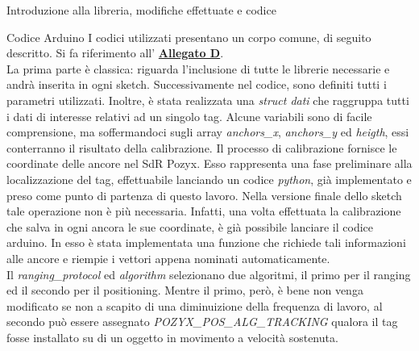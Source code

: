 \documentclass[12pt]{report}
\begin{document}
\begin{section}{Introduzione alla libreria, modifiche effettuate e codice}
\begin{subsection}{Codice Arduino}
			I codici utilizzati presentano un corpo comune, di seguito descritto. Si fa riferimento all' \hyperlink{A4}{\textbf{Allegato D}}.\\ 
			La prima parte è classica: riguarda l’inclusione di tutte le librerie necessarie e andrà inserita in ogni sketch. Successivamente nel codice, sono definiti tutti i parametri utilizzati. Inoltre, è stata realizzata una \textit{struct dati} che raggruppa tutti i dati di interesse relativi ad un singolo tag. Alcune 											variabili sono di facile comprensione, ma soffermandoci sugli array \textit{anchors\_x}, \textit{anchors\_y} ed \textit{heigth}, essi conterranno il risultato della calibrazione. Il processo di calibrazione fornisce le coordinate delle ancore nel SdR Pozyx. Esso rappresenta una fase preliminare alla localizzazione del 					tag, effettuabile lanciando un codice \textit{python}, già implementato e preso come punto di partenza di questo lavoro. Nella versione finale dello sketch tale operazione non è più necessaria. Infatti, una volta effettuata la calibrazione che salva in ogni ancora le sue coordinate, è già possibile lanciare il codice 					arduino. In esso è stata implementata una funzione che richiede tali informazioni alle ancore e riempie i vettori appena nominati automaticamente.\\
			Il	\textit{ranging\_protocol} ed  \textit{algorithm} selezionano due algoritmi, il primo per il ranging ed il secondo per il positioning. Mentre il primo, però, è bene non venga modificato se non a scapito di una diminuizione della frequenza di lavoro, al secondo può essere assegnato 
			\textit{POZYX\_POS\_ALG\_TRACKING} qualora il tag fosse installato su di un oggetto in movimento a velocità sostenuta. \\

\end{subsection}
\end{section}
\end{document}
